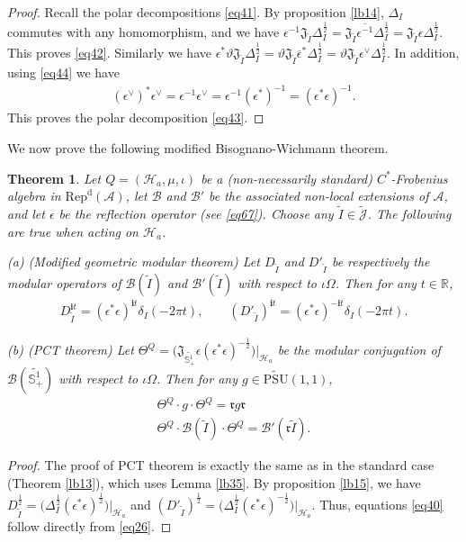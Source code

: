 \documentclass[12pt,a4paper]{article}
\theoremstyle{definition}
\theoremstyle{plain}
\newtheorem{thm}[df]{Theorem}
\newcommand{\fk}{\mathfrak}
\newcommand{\mc}{\mathcal}
\newcommand{\wtd}{\widetilde}
\newcommand{\ovl}{\overline}
\newcommand{\UPSU}{\widetilde{\mathrm{PSU}}(1,1)}
\newcommand{\Jtd}{\widetilde{\mathcal J}}
\newcommand{\im}{\mathbf{i}}
\newcommand{\RepdA}{\mathrm{Rep}^{\mathrm d}(\mc A)}
\newcommand{\mbb}{\mathbb}
\numberwithin{equation}{section}
\begin{document}
\begin{proof}
Recall the polar decompositions \eqref{eq41}.  By proposition \ref{lb14}, $\Delta_I$ commutes with any homomorphism, and we have $\epsilon^{-1}\fk J_{\wtd I}\Delta_I^{\frac 12}=\fk J_{\wtd I}\ovl{\epsilon^{-1}}\Delta_I^{\frac 12}=\fk J_{\wtd I}\epsilon\Delta_I^{\frac 12}$. This proves \eqref{eq42}. Similarly we have $\epsilon^*\vartheta\fk J_{\wtd I}\Delta_I^{\frac 12}=\vartheta\fk J_{\wtd I}\ovl\epsilon^*\Delta_I^{\frac 12}=\vartheta\fk J_{\wtd I}\epsilon^\vee\Delta_I^{\frac 12}$. In addition, using \eqref{eq44} we have
\begin{align}
(\epsilon^\vee)^*\epsilon^\vee=\epsilon^{-1}\epsilon^\vee=\epsilon^{-1}(\epsilon^*)^{-1}=(\epsilon^*\epsilon)^{-1}.
\end{align}
This proves the polar decomposition \eqref{eq43}.
\end{proof}

We now prove the following modified Bisognano-Wichmann theorem.

\begin{thm}\label{lb27}
Let $Q=(\mc H_a,\mu,\iota)$ be a (non-necessarily standard) $C^*$-Frobenius algebra in $\RepdA$, let $\mc B$ and $\mc B'$ be the associated non-local extensions of $\mc A$, and let $\epsilon$ be the reflection operator (see \eqref{eq67}). Choose any $\wtd I\in\Jtd$. The following are true when acting on $\mc H_a$.

(a) (Modified geometric modular theorem) Let $D_{\wtd I}$ and $D'_{\wtd I}$ be respectively the modular operators of $\mc B(\wtd I)$ and $\mc B'(\wtd I)$ with respect to $\iota\Omega$. Then for any $t\in\mathbb R$,
\begin{align}
D_{\wtd I}^{\im t}=(\epsilon^*\epsilon)^{\im t}\delta_I(-2\pi t),\qquad (D'_{\wtd I})^{\im t}=(\epsilon^*\epsilon)^{-\im t}\delta_I(-2\pi t).\label{eq40}
\end{align}

(b) (PCT theorem) Let $\Theta^Q=\big(\fk J_{\wtd {\mbb S^1_+}}\epsilon(\epsilon^*\epsilon)^{-\frac 12}\big)\big|_{\mc H_a}$ be the modular conjugation of $\mc B(\wtd {\mbb S^1_+})$ with respect to $\iota\Omega$. Then for any $g\in\UPSU$,
\begin{gather}
\Theta^Q \cdot g \cdot\Theta^Q=\fk r g\fk r\\
\Theta^Q\cdot\mc B(\wtd I)\cdot\Theta^Q=\mc B'(\fk r\wtd I). 
\end{gather}
\end{thm}


\begin{proof}
The proof of PCT theorem is exactly the same as in the standard case (Theorem \ref{lb13}), which uses Lemma \ref{lb35}. By proposition \ref{lb15}, we have $D_{\wtd I}^{\frac 12}=\big(\Delta_I^{\frac 12}(\epsilon^*\epsilon)^{\frac 12}\big)\Big|_{\mc H_a}$ and $(D'_{\wtd I})^{\frac 12}=\big(\Delta_I^{\frac 12}(\epsilon^*\epsilon)^{-\frac 12}\big)\Big|_{\mc H_a}$. Thus, equations \eqref{eq40} follow directly from \eqref{eq26}.
\end{proof}	
\end{document}
